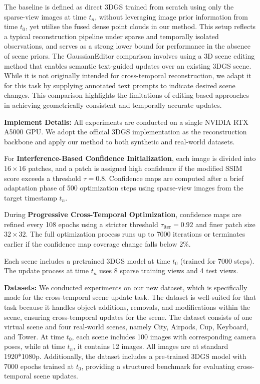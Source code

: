 \documentclass[letterpaper]{article} %
\begin{document}
The baseline is defined as direct 3DGS \cite{kerbl20233d} trained from scratch using only the sparse-view images at time $t_n$, without leveraging image prior information from time $t_0$, yet utilise the fused dense point clouds in our method. This setup reflects a typical reconstruction pipeline under sparse and temporally isolated observations, and serves as a strong lower bound for performance in the absence of scene priors.
The GaussianEditor \cite{chen2024gaussianeditor} comparison involves using a 3D scene editing method that enables semantic text-guided updates over an existing 3DGS scene. While it is not originally intended for cross-temporal reconstruction, we adapt it for this task by supplying annotated text prompts to indicate desired scene changes. This comparison highlights the limitations of editing-based approaches in achieving geometrically consistent and temporally accurate updates.


\textbf{Implement Details:}
All experiments are conducted on a single NVIDIA RTX A5000 GPU. We adopt the official 3DGS implementation as the reconstruction backbone and apply our method to both synthetic and real-world datasets.

For \textbf{Interference-Based Confidence Initialization}, each image is divided into $16\times16$ patches, and a patch is assigned high confidence if the modified SSIM score exceeds a threshold $\tau = 0.8$. Confidence maps are computed after a brief adaptation phase of 500 optimization steps using sparse-view images from the target timestamp $t_n$.

During \textbf{Progressive Cross-Temporal Optimization}, confidence maps are refined every 108 epochs using a stricter threshold $\tau_{\text{iter}} = 0.92$ and finer patch size $32\times32$. The full optimization process runs up to 7000 iterations or terminates earlier if the confidence map coverage change falls below 2\%. 

Each scene includes a pretrained 3DGS model at time $t_0$ (trained for 7000 steps). The update process at time $t_n$ uses 8 sparse training views and 4 test views. 

\textbf{Datasets:} 
We conducted experiments on our new dataset, which is specifically made for the cross-temporal scene update task. The dataset is well-suited for that task because it handles object additions, removals, and modifications within the scene, ensuring cross-temporal updates for the scene. 
The dataset consists of one virtual scene and four real-world scenes, namely City, Airpods, Cup, Keyboard, and Tower. At time $t_0$, each scene includes 100 images with corresponding camera poses, while at time $t_n$, it contains 12 images. All images are at standard 1920*1080p.
Additionally, the dataset includes a pre-trained 3DGS model with 7000 epochs trained at $t_0$, providing a structured benchmark for evaluating cross-temporal scene updates.
\end{document}
